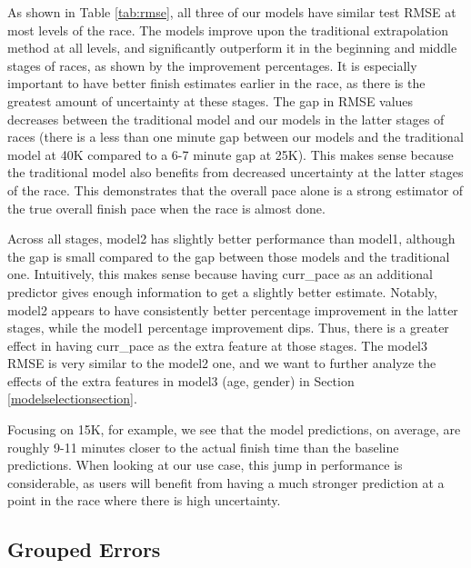 \documentclass[USenglish,twocolumn]{article}
\theoremstyle{dgthm}
\theoremstyle{dgdef}
\begin{document}
As shown in Table \ref{tab:rmse}, all three of our models have similar test RMSE at most levels of the race. The models improve upon the traditional extrapolation method at all levels, and significantly outperform it in the beginning and middle stages of races, as shown by the improvement percentages. It is especially important to have better finish estimates earlier in the race, as there is the greatest amount of uncertainty at these stages. The gap in RMSE values decreases between the traditional model and our models in the latter stages of races (there is a less than one minute gap between our models and the traditional model at 40K compared to a 6-7 minute gap at 25K). This makes sense because the traditional model also benefits from decreased uncertainty at the latter stages of the race. This demonstrates that the overall pace alone is a strong estimator of the true overall finish pace when the race is almost done. %

Across all stages, model2 has slightly better performance than model1, although the gap is small compared to the gap between those models and the traditional one. Intuitively, this makes sense because having curr\_pace as an additional predictor gives enough information to get a slightly better estimate. Notably, model2 appears to have consistently better percentage improvement in the latter stages, while the model1 percentage improvement dips. Thus, there is a greater effect in having curr\_pace as the extra feature at those stages. The model3 RMSE is very similar to the model2 one, and we want to further analyze the effects of the extra features in model3 (age, gender) in Section \ref{modelselectionsection}.

Focusing on 15K, for example, we see that the model predictions, on average, are roughly 9-11 minutes closer to the actual finish time than the baseline predictions. When looking at our use case, this jump in performance is considerable, as users will benefit from having a much stronger prediction at a point in the race where there is high uncertainty. 

\subsection{Grouped Errors}
\label{groupederrorsection}
\end{document}
